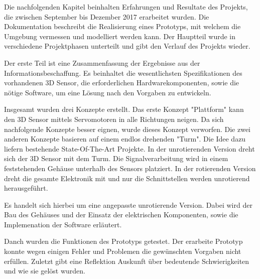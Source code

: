 Die nachfolgenden Kapitel beinhalten Erfahrungen und Resultate des Projekts, die zwischen September bis Dezember 2017 erarbeitet wurden. Die Dokumentation beschreibt die Realisierung eines Prototyps, mit welchem die Umgebung vermessen und modelliert werden kann. Der Hauptteil wurde in verschiedene Projektphasen unterteilt und gibt den Verlauf des Projekts wieder.

Der erste Teil ist eine Zusammenfassung der Ergebnisse aus der Informationsbeschaffung. Es beinhaltet die wesentlichsten Spezifikationen des vorhandenen 3D Sensor, die erforderlichen Hardwarekomponenten, sowie die nötige Software, um eine Lösung nach den Vorgaben zu entwickeln. 

Insgesamt wurden drei Konzepte erstellt. Das erste Konzept "Plattform" kann den 3D Sensor mittels Servomotoren in alle Richtungen neigen. Da sich nachfolgende Konzepte besser eignen, wurde dieses Konzept verworfen. Die zwei anderen Konzepte basieren auf einem endlos drehenden "Turm". Die Idee dazu liefern bestehende State-Of-The-Art Projekte. In der unrotierenden Version dreht sich der 3D Sensor mit dem Turm. Die Signalverarbeitung wird in einem feststehenden Gehäuse unterhalb des Sensors platziert. In der rotierenden Version dreht die gesamte Elektronik mit und nur die Schnittstellen werden unrotierend herausgeführt.

Es handelt sich hierbei um eine angepasste unrotierende Version. Dabei wird der Bau des Gehäuses und der Einsatz der elektrischen Komponenten, sowie die Implemenation der Software erläutert.

Danch wurden die Funktionen des Prototyps getestet. Der erarbeite Prototyp konnte wegen einigen Fehler und Problemen die gewünschten Vorgaben nicht erfüllen. Zuletzt gibt eine Reflektion Auskunft über bedeutende Schwierigkeiten und wie sie gelöst wurden. 





